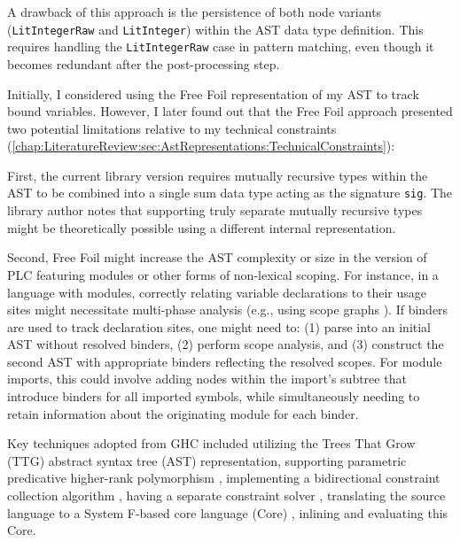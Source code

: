 A drawback of this approach is the persistence of both node variants (\texttt{LitIntegerRaw} and \texttt{LitInteger}) within the AST data type definition. This requires handling the \texttt{LitIntegerRaw} case in pattern matching, even though it becomes redundant after the post-processing step.



Initially, I considered using the Free Foil representation of my AST to track bound variables. However, I later found out that the Free Foil approach presented two potential limitations relative to my technical constraints (\cref{chap:LiteratureReview:sec:AstRepresentations:TechnicalConstraints}):

First, the current library version requires mutually recursive types within the AST to be combined into a single sum data type acting as the signature \texttt{sig}. The library author notes that supporting truly separate mutually recursive types might be theoretically possible using a different internal representation.

Second, Free Foil might increase the AST complexity or size in the version of PLC featuring modules or other forms of non-lexical scoping. For instance, in a language with modules, correctly relating variable declarations to their usage sites might necessitate multi-phase analysis (e.g., using scope graphs \cite{poulsen-monadic-2023}). If binders are used to track declaration sites, one might need to: (1) parse into an initial AST without resolved binders, (2) perform scope analysis, and (3) construct the second AST with appropriate binders reflecting the resolved scopes. For module imports, this could involve adding nodes within the import's subtree that introduce binders for all imported symbols, while simultaneously needing to retain information about the originating module for each binder.



Key techniques adopted from GHC included utilizing the Trees That Grow (TTG) \cite{trees-that-grow-2016} abstract syntax tree (AST) representation, supporting parametric predicative higher-rank polymorphism \cite{jones-practical-2007}, implementing a bidirectional constraint collection algorithm \cite{jones-typechecker-2023}, having a separate constraint solver \cite{jones-typechecker-2023}, translating the source language to a System F-based core language (Core) \cite{jones-practical-2007}, inlining \cite{jones-rapier-2002} and evaluating this Core.

